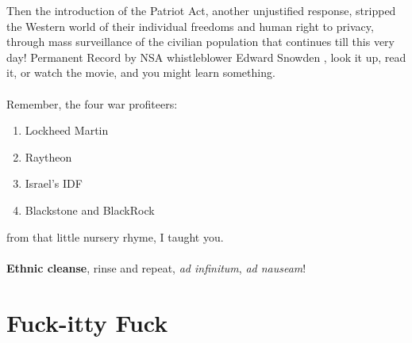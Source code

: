 \documentclass[16pt,openany,oneside]{book}
\begin{document}
Then the introduction of the Patriot Act, another unjustified response, stripped the Western world of their individual freedoms and human right to privacy, through mass surveillance of the civilian population that continues till this very day! Permanent Record by NSA whistleblower Edward Snowden \cite{snowden2019permanent}, look it up, read it, or watch the movie, and you might learn something.
\\\\
Remember, the four war profiteers:

\begin{enumerate}
    \item Lockheed Martin 
    \item Raytheon
    \item Israel's IDF
    \item Blackstone and BlackRock
\end{enumerate}

\noindent from that little nursery rhyme, I taught you.
\\\\
\textbf{Ethnic cleanse}, rinse and repeat, \textit{ad infinitum}, \textit{ad nauseam}!

\chapter{Fuck-itty Fuck}
\end{document}
